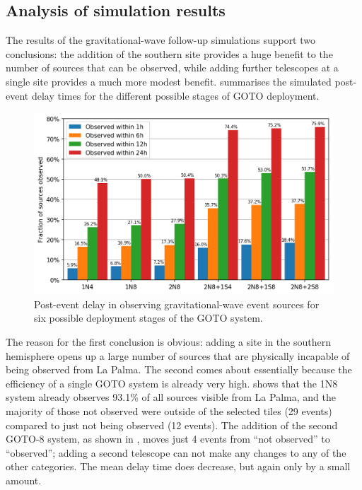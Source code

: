 \subsection{Analysis of simulation results}
\label{sec:gw_sim_analysis}
\begin{colsection}

The results of the gravitational-wave follow-up simulations support two conclusions: the addition of the southern site provides a huge benefit to the number of sources that can be observed, while adding further telescopes at a single site provides a much more modest benefit.  summarises the simulated post-event delay times for the different possible stages of GOTO deployment.

\begin{figure}[t]
    \begin{center}
        \includegraphics[width=\linewidth]{images/gw_sims/results.png}
    \end{center}
    \caption[Simulation delay time for different GOTO systems]{
        Post-event delay in observing gravitational-wave event sources for six possible deployment stages of the GOTO system.
    }\label{fig:gw_sim_results}
\end{figure}

The reason for the first conclusion is obvious: adding a site in the southern hemisphere opens up a large number of sources that are physically incapable of being observed from La Palma. The second comes about essentially because the efficiency of a single GOTO system is already very high.  shows that the 1N8 system already observes 93.1\% of all sources visible from La Palma, and the majority of those not observed were outside of the selected tiles (29 events) compared to just not being observed (12 events). The addition of the second GOTO-8 system, as shown in , moves just 4 events from ``not observed'' to ``observed''; adding a second telescope can not make any changes to any of the other categories. The mean delay time does decrease, but again only by a small amount.


\end{colsection}

